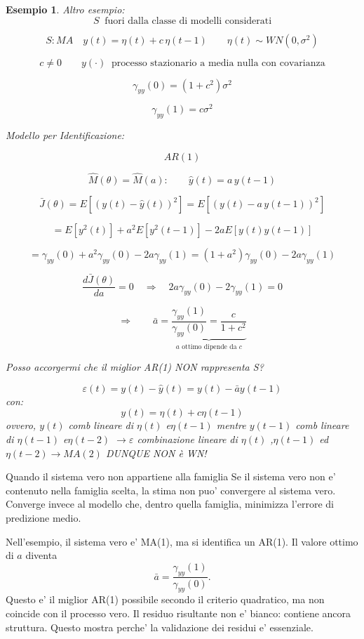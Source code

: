 \documentclass[11pt,a4paper]{article}
\newtheorem{example}{Esempio}
\begin{document}
\begin{example}
    Altro esempio:\\
    
\[
S\ \text{ fuori dalla classe di modelli considerati}
\]

\[
S:
MA\quad
y(t)=\eta(t)+c\,\eta(t-1)
\qquad
\eta(t)\sim WN(0,\sigma^2)
\]

\[
c\neq 0
\qquad
y(\cdot)\ \text{ processo stazionario a media nulla con covarianza}
\]

\[
\gamma_{yy}(0)=(1+c^2)\sigma^2
\]

\[
\gamma_{yy}(1)=c\sigma^2
\]

\vspace{1em}

Modello per Identificazione:

\[
AR(1)
\]

\[
\hat M(\theta)=\hat M(a):\qquad \hat y(t)=a\,y(t-1)
\]

\[
\bar J(\theta)=E[(y(t)-\hat y(t))^2]
=
E[(y(t)-a\,y(t-1))^2]
\]

\[
=
E[y^2(t)]+a^2E[y^2(t-1)]-2aE[y(t)y(t-1)]
\]

\[
=
\gamma_{yy}(0)+a^2\gamma_{yy}(0)-2a\gamma_{yy}(1)
=
(1+a^2)\gamma_{yy}(0)-2a\gamma_{yy}(1)
\]

\[
\frac{d\bar J(\theta)}{da}=0
\quad\Rightarrow\quad
2a\gamma_{yy}(0)-2\gamma_{yy}(1)=0
\]

\[
\Rightarrow\qquad
\bar a=
\underbrace{\frac{\gamma_{yy}(1)}{\gamma_{yy}(0)}
=
\frac{c}{1+c^2}}_{\text{$a$ ottimo dipende da $c$}}
\]

Posso accorgermi che il miglior AR(1) NON rappresenta S?

\[
\varepsilon(t) = y(t) - \hat{y}(t) = y(t) - \bar{a}y(t-1)
\]
con:
\[
y(t) = \eta(t) + c\eta(t-1)
\]
ovvero, $y(t)$ comb lineare di $\eta(t)$ e$\eta(t-1)$ mentre $y(t-1)$ comb lineare di $\eta(t-1)$ e$\eta(t-2)$ $\rightarrow \varepsilon$ combinazione lineare di $\eta(t)$ ,$\eta(t-1)$ ed   $\eta(t-2) \rightarrow MA(2)$ DUNQUE NON è WN!  
\end{example}

\begin{spiegazione}{Quando il sistema vero non appartiene alla famiglia}
Se il sistema vero non e' contenuto nella famiglia scelta, la stima non puo' convergere al sistema vero. Converge invece al modello che, dentro quella famiglia, minimizza l'errore di predizione medio.

Nell'esempio, il sistema vero e' MA(1), ma si identifica un AR(1). Il valore ottimo di $a$ diventa
\[
\bar a=\frac{\gamma_{yy}(1)}{\gamma_{yy}(0)}.
\]
Questo e' il miglior AR(1) possibile secondo il criterio quadratico, ma non coincide con il processo vero. Il residuo risultante non e' bianco: contiene ancora struttura. Questo mostra perche' la validazione dei residui e' essenziale.
\end{spiegazione}
\end{document}

